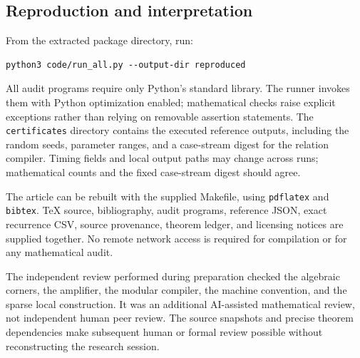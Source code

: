 \subsection{Reproduction and interpretation}

From the extracted package directory, run:
\begin{verbatim}
python3 code/run_all.py --output-dir reproduced
\end{verbatim}
All audit programs require only Python's standard library.
The runner invokes them with Python optimization enabled;
mathematical checks raise explicit exceptions rather than relying
on removable assertion statements. The \texttt{certificates}
directory contains the executed reference outputs, including the
random seeds, parameter ranges, and a case-stream digest for the
relation compiler. Timing fields and local output paths may
change across runs; mathematical counts and the fixed case-stream
digest should agree.

The article can be rebuilt with the supplied Makefile, using
\texttt{pdflatex} and \texttt{bibtex}. TeX source, bibliography,
audit programs, reference JSON, exact recurrence CSV, source
provenance, theorem ledger, and licensing notices are supplied
together. No remote network access is required for compilation
or for any mathematical audit.

The independent review performed during preparation checked
the algebraic corners, the amplifier, the modular compiler,
the machine convention, and the sparse local construction.
It was an additional AI-assisted mathematical review, not
independent human peer review. The source snapshots and precise
theorem dependencies make subsequent human or formal review
possible without reconstructing the research session.

